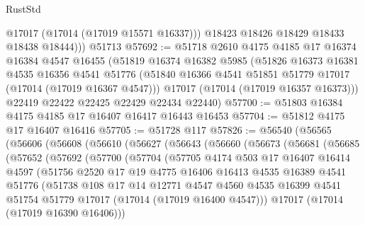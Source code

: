 \begin{lexlean}{RustStd}
\begin{coremodule}
{\begin{coremodule}
{{{{{{{{{{{{{{{{{{{{{{{{{{{{{{{{{{{{{{{{{{{{{{{{{{{{{{{            @17017
            (@17014 (@17019 @15571 @16337)))
          @18423
          @18426
          @18429
          @18433
          @18438
          @18444)))
    @51713
@57692 := @51718
    @2610
    @4175
    @4185
    @17
    @16374
    @16384
    @4547
    @16455
    (@51819
      @16374
      @16382
      @5985
      (@51826
        @16373
        @16381
        @4535
        @16356
        @4541
        @51776
        (@51840 @16366 @4541 @51851 @51779 @17017 (@17014 (@17019 @16367 @4547)))
        @17017
        (@17014 (@17019 @16357 @16373)))
      @22419
      @22422
      @22425
      @22429
      @22434
      @22440)
@57700 := @51803 @16384 @4175 @4185 @17 @16407 @16417 @16443 @16453
@57704 := @51812 @4175 @17 @16407 @16416
@57705 := @51728 @117
@57826 := @56540
    (@56565
      (@56606
        (@56608
          (@56610
            (@56627
              (@56643
                (@56660
                  (@56673
                    (@56681
                      (@56685
                        (@57652
                          (@57692
                            (@57700
                              (@57704
                                (@57705
                                  @4174
                                  @503
                                  @17
                                  @16407
                                  @16414
                                  @4597
                                  (@51756
                                    @2520
                                    @17
                                    @19
                                    @4775
                                    @16406
                                    @16413
                                    @4535
                                    @16389
                                    @4541
                                    @51776
                                    (@51738
                                      @108
                                      @17
                                      @14
                                      @12771
                                      @4547
                                      @4560
                                      @4535
                                      @16399
                                      @4541
                                      @51754
                                      @51779
                                      @17017
                                      (@17014 (@17019 @16400 @4547)))
                                    @17017
                                    (@17014 (@17019 @16390 @16406)))
}}}}}}}}}}}}}}}}}}}}}}}}}}}}}}}}}}}}}}}}}}}}}}}}}}}}}}}
\end{coremodule}}
\end{coremodule}
\end{lexlean}
